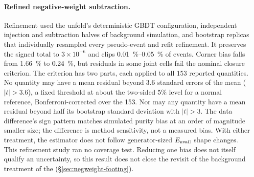 \paragraph{Refined negative-weight subtraction.} Refinement used the unfold's deterministic GBDT configuration, independent injection and subtraction halves of background simulation, and bootstrap replicas that individually resampled every pseudo-event and refit refinement. It preserves the signed total to $3\times10^{-6}$ and clips \SIrange{0.01}{0.05}{\percent} of events. Corner bias falls from \SI{1.66}{\percent} to \SI{0.24}{\percent}, but residuals in some joint cells fail the nominal closure criterion. The criterion has two parts, each applied to all 153 reported quantities. No quantity may have a mean residual beyond 3.6 standard errors of the mean ($|t|>3.6$), a fixed threshold at about the two-sided 5\% level for a normal reference, Bonferroni-corrected over the 153. Nor may any quantity have a mean residual beyond half its bootstrap standard deviation with $|t|>3$. The data difference's sign pattern matches simulated purity bias at an order of magnitude smaller size; the difference is method sensitivity, not a measured bias. With either treatment, the estimator does not follow generator-sized $E_{\mathrm{avail}}$ shape changes. This refinement study ran no coverage test. Reducing one bias does not itself qualify an uncertainty, so this result does not close the revisit of the background treatment of the \resFiveAxis{} (\S\ref{sec:negweight-footing}).

